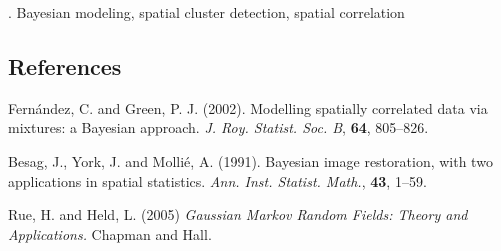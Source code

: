 \documentclass[12pt]{article}
\begin{document}

\vskip 2mm

.
Bayesian modeling, spatial cluster detection, spatial correlation


%        
%
%        

\subsection*{References}

\begin{description}

\item 
Fern\'andez, C. and Green, P. J. (2002). 
Modelling spatially correlated data via mixtures: a Bayesian approach. 
\textit{J. Roy. Statist. Soc. B}, \textbf{64}, 805--826. 

\item 
Besag, J., York, J. and Molli\'e, A. (1991). 
Bayesian image restoration, with two applications in spatial statistics.
\textit{Ann. Inst. Statist. Math.}, \textbf{43}, 1--59. 

\item 
Rue, H. and Held, L. (2005)
\textit{Gaussian Markov Random Fields: Theory and Applications.}
Chapman and Hall.

\end{description}
\end{document}

